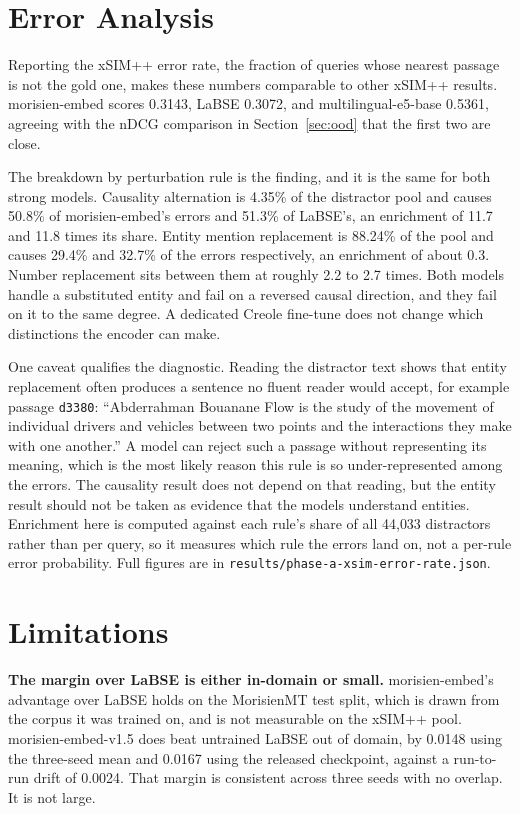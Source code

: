 \documentclass[11pt]{article}
\begin{document}
\section{Error Analysis}

Reporting the xSIM++ error rate, the fraction of queries whose nearest passage is not the gold one,
makes these numbers comparable to other xSIM++ results. morisien-embed scores 0.3143, LaBSE 0.3072,
and multilingual-e5-base 0.5361, agreeing with the nDCG comparison in Section~\ref{sec:ood} that the
first two are close.

The breakdown by perturbation rule is the finding, and it is the same for both strong models.
Causality alternation is 4.35\% of the distractor pool and causes 50.8\% of morisien-embed's errors
and 51.3\% of LaBSE's, an enrichment of 11.7 and 11.8 times its share. Entity mention replacement is
88.24\% of the pool and causes 29.4\% and 32.7\% of the errors respectively, an enrichment of about
0.3. Number replacement sits between them at roughly 2.2 to 2.7 times. Both models handle a
substituted entity and fail on a reversed causal direction, and they fail on it to the same degree.
A dedicated Creole fine-tune does not change which distinctions the encoder can make.

One caveat qualifies the diagnostic. Reading the distractor text shows that entity replacement often
produces a sentence no fluent reader would accept, for example passage \texttt{d3380}:
``Abderrahman Bouanane Flow is the study of the movement of individual drivers and vehicles between
two points and the interactions they make with one another.'' A model can reject such a passage
without representing its meaning, which is the most likely reason this rule is so under-represented
among the errors. The causality result does not depend on that reading, but the entity result should
not be taken as evidence that the models understand entities. Enrichment here is computed against
each rule's share of all 44{,}033 distractors rather than per query, so it measures which rule the
errors land on, not a per-rule error probability. Full figures are in
\texttt{results/phase-a-xsim-error-rate.json}.

\section{Limitations}
\label{sec:limitations}

\textbf{The margin over LaBSE is either in-domain or small.} morisien-embed's advantage over LaBSE
holds on the MorisienMT test split, which is drawn from the corpus it was trained on, and is not
measurable on the xSIM++ pool. morisien-embed-v1.5 does beat untrained LaBSE out of domain, by 0.0148
using the three-seed mean and 0.0167 using the released checkpoint, against a run-to-run drift of
0.0024. That margin is consistent across three seeds with no overlap. It is not large.
\end{document}
